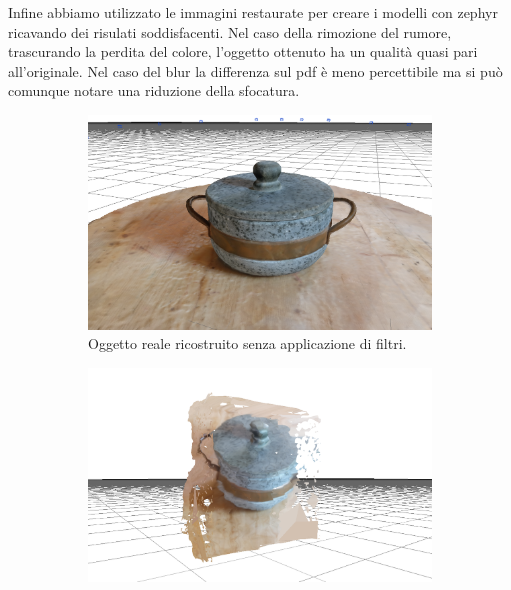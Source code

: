 \documentclass[12pt]{report}
\begin{document}
Infine abbiamo utilizzato le immagini restaurate per creare i modelli con zephyr ricavando dei risulati soddisfacenti. Nel caso della rimozione del rumore, trascurando la perdita del colore, l'oggetto ottenuto ha un qualit\`a quasi pari all'originale. Nel caso del blur la differenza sul pdf \`e meno percettibile ma si può comunque notare una riduzione della sfocatura.




\begin{figure}[H]
  \centering
  \begin{subfigure}[b]{0.45\linewidth}
    \centering
    \includegraphics[width=\linewidth]{img/pentola/oggetto.png}
    \captionsetup{justification=centering}
    \caption{Oggetto reale ricostruito senza applicazione di filtri.} %
  \end{subfigure}
   \begin{subfigure}[b]{0.45\linewidth}
    \centering
    \includegraphics[width=\linewidth]{img/pentola/oggetto_blurred.png}

\end{subfigure}
\end{figure}
\end{document}
